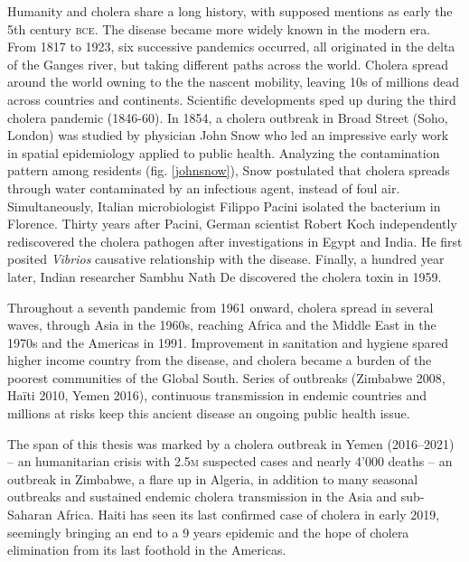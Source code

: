 Humanity and cholera share a long history, with supposed mentions as early the 5th century \textsc{bce}. The disease became more widely known in the modern era. From 1817 to 1923, six successive pandemics occurred, all originated in the delta of the Ganges river, but taking different paths across the world. Cholera spread around the world owning to the the nascent mobility, leaving 10s of millions dead across countries and continents.  Scientific developments sped up during the third cholera pandemic (1846-60). In 1854, a cholera outbreak in Broad Street (Soho, London) was studied by physician John Snow who led an impressive early work in spatial epidemiology applied to public health. Analyzing the contamination pattern among residents (fig. \ref{johnsnow}), Snow postulated that cholera spreads through water contaminated by an infectious agent, instead of foul air.  Simultaneously, Italian microbiologist Filippo Pacini isolated the bacterium in Florence\cite{Pacini:OsservazioniMicroscopicheDeduzioni:1854}. Thirty years after Pacini, German scientist Robert Koch independently rediscovered the cholera pathogen after investigations in Egypt and India. He first posited \textit{Vibrios} causative relationship with the disease. Finally, a hundred year later, Indian researcher Sambhu Nath De discovered the cholera toxin in 1959\cite{De:ExperimentalStudyAction:1951}.

Throughout a seventh pandemic from 1961 onward, cholera spread in several waves, through Asia in the 1960s, reaching Africa and the Middle East in the 1970s and the Americas in 1991\cite{Mutreja:EvidenceSeveralWaves:2011}. Improvement in sanitation and hygiene spared higher income country from the disease, and cholera became a burden of the poorest communities of the Global South. Series of outbreaks (\eg Zimbabwe 2008, Haïti 2010, Yemen 2016), continuous transmission in endemic countries and millions at risks keep this ancient disease an ongoing public health issue.

The span of this thesis was marked by a cholera outbreak in Yemen (2016--2021) -- an humanitarian crisis with 2.5\textsc{m} suspected cases and nearly 4'000 deaths -- an outbreak in Zimbabwe, a flare up in Algeria, in addition to many seasonal outbreaks and sustained endemic cholera transmission in the Asia and sub-Saharan Africa. Haiti has seen its last confirmed case of cholera in early 2019, seemingly bringing an end to a 9 years epidemic and the hope of cholera elimination from its last foothold in the Americas. 

